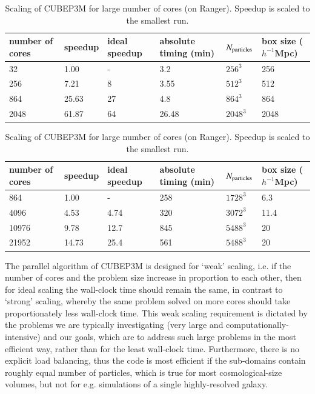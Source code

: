 \begin{table}%
  \vskip -0.5cm 
  \begin{center}
\caption{Scaling of {\small CUBEP3M} on Curie. Speedup is 
scaled to the smallest run.}
\label{summary_scaling_table}
\begin{tabular}{@{}|llllll|}
\hline
number of cores & speedup & ideal speedup & absolute timing (min) & 
$N_{\rm particles}$& box size ($h^{-1}$Mpc)
\\[2mm]\hline
32  &  1.00 & - &3.2 & $256^3$ & 256\\
256  & 7.21 & 8 &3.55 & $512^3$  & 512\\
864  & 25.63 & 27 &4.8 & $864^3$  & 864\\
2048  & 61.87 & 64 &26.48 & $2048^3$ & 2048 \\
\hline
\end{tabular}
\caption{Scaling of  {\small CUBEP3M} for large number of cores 
(on Ranger). Speedup is scaled to the smallest run.}
\label{summary_scaling_table2}
\begin{tabular}{@{}|llllll|}
\hline
number of cores & speedup & ideal speedup & absolute timing (min) & 
$N_{\rm particles}$& box size ($h^{-1}$Mpc)
\\[2mm]\hline
864    & 1.00  & -    &258   & $1728^3$  & 6.3\\
4096   & 4.53  & 4.74 &320   & $3072^3$  & 11.4\\
10976  & 9.78  & 12.7 &845   & $5488^3$  & 20\\
21952  & 14.73 & 25.4 &561   & $5488^3$  & 20 \\
\hline
\end{tabular}
\end{center}
  \vskip -0.7cm 
\end{table}


The parallel algorithm of {\small CUBEP3M} is designed for `weak' 
scaling, i.e. if the number of cores and the problem size 
increase in proportion to each other, then for ideal scaling the 
wall-clock time should remain the same, in contrast to `strong' 
scaling, whereby the same problem solved on more cores should take 
proportionately less wall-clock time. This weak scaling requirement 
is dictated by the problems we are typically investigating (very 
large and computationally-intensive) and our goals, which are to 
address such large problems in the most efficient way, rather than 
for the least wall-clock time. Furthermore, there is no explicit 
load balancing, thus the code is most efficient if the sub-domains
contain roughly equal number of particles, which is true for most
cosmological-size volumes, but not for e.g. simulations of a single
highly-resolved galaxy. 

